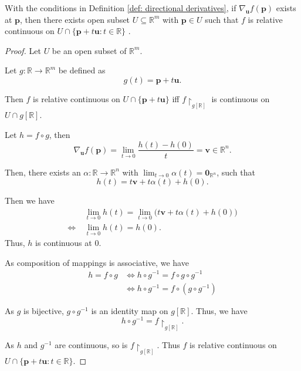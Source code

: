 \begin{lemma}
	\label{lm: direction derivative exists implies relative continuous}
	With the conditions in Definition \ref{def: directional derivatives}, if $\nabla_{\mathbf u}f(\mathbf p)$ exists at $\mathbf p$, then there exists open subset $U \subseteq \mathbb R^m$ with $\mathbf p \in U$ such that $f$ is relative continuous on $U \cap \{\mathbf p + t \mathbf u : t\in \mathbb R\}$ .
	
	\begin{proof}	
		Let $U$ be an open subset of $\mathbb R^m$.
	
		Let $g: \mathbb R \to \mathbb R^m$ be defined as
		$$
		g(t) = \mathbf p + t \mathbf u.
		$$
	
		Then $f$ is relative continuous on $U \cap \{\mathbf p + t\mathbf u\}$ iff $f\restriction_{g[\mathbb R]}$ is continuous on $U \cap g[\mathbb R]$.
		
		Let $h = f \circ g$, then
		$$
		\nabla_{\mathbf u} f(\mathbf p) = \lim_{t \to 0} \frac{h(t) - h(0)}{t} = \mathbf v \in \mathbb R^n.
		$$
		
		Then, there exists an $\alpha: \mathbb R \to \mathbb R^n$ with $\displaystyle \lim_{t \to 0}\alpha(t) = \mathbf 0_{\mathbb R^n}$, such that
		$$
		h(t) = t\mathbf v +  t\alpha(t) + h(0).
		$$
		
		Then we have
		$$
		\begin{aligned}
			& \ \lim_{t \to 0}h(t) = \lim_{t \to 0} \big( t \mathbf v + t\alpha(t) + h(0) \big) \\
			\iff & \ \lim_{t \to 0}h(t) = h(0).
		\end{aligned}
		$$
		Thus, $h$ is continuous at $0$.
		
		As composition of mappings is associative, we have
		$$
		\begin{aligned}
			h = f\circ g &\iff h \circ g^{-1} = f \circ g \circ g^{-1} \\
			&\iff h \circ g^{-1} = f \circ (g \circ g^{-1})
		\end{aligned}
		$$
		
		As $g$ is bijective, $g \circ g^{-1}$ is an identity map on $g[\mathbb R]$. Thus, we have
		$$
		h \circ g^{-1} = f \restriction_{g[\mathbb R]}.
		$$
		
		As $h$ and $g^{-1}$ are continuous, so is $f\restriction_{g[\mathbb R]}$. Thus $f$ is relative continuous on $U \cap \{\mathbf p + t \mathbf u: t \in \mathbb R\}$.
	\end{proof}
\end{lemma}


